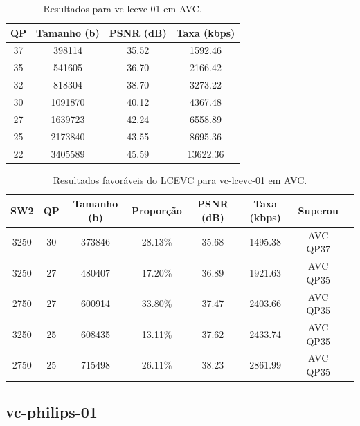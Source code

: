 \begin{table}[h]
    \centering
    \begin{tabular}{|c|c|c|c|}
        \hline
        \textbf{QP} & \textbf{Tamanho (b)} & \textbf{PSNR (dB)} & \textbf{Taxa (kbps)} \\
        \hline
        37 & 398114 & 35.52 & 1592.46 \\
        35 & 541605 & 36.70 & 2166.42 \\
        32 & 818304 & 38.70 & 3273.22 \\
        30 & 1091870 & 40.12 & 4367.48 \\
        27 & 1639723 & 42.24 & 6558.89 \\
        25 & 2173840 & 43.55 & 8695.36 \\
        22 & 3405589 & 45.59 & 13622.36 \\
        \hline
    \end{tabular}
    \caption{Resultados para vc-lcevc-01 em AVC.}
    \label{tab:vc-lcevc-01-avc}
\end{table}

\begin{table}[h]
    \centering
    \label{tab:vc-lcevc-01-avc-lcevc}
    \begin{tabular}{|c|c|c|c|c|c|c|c|}
        \hline
        \textbf{SW2} & \textbf{QP} & \textbf{Tamanho (b)} & \textbf{Proporção} & \textbf{PSNR (dB)} & \textbf{Taxa (kbps)} & \textbf{Superou} \\
        \hline
        3250 & 30 & 373846 & 28.13\% & 35.68 & 1495.38 & AVC QP37 \\
        3250 & 27 & 480407 & 17.20\% & 36.89 & 1921.63 & AVC QP35 \\
        2750 & 27 & 600914 & 33.80\% & 37.47 & 2403.66 & AVC QP35 \\
        3250 & 25 & 608435 & 13.11\% & 37.62 & 2433.74 & AVC QP35 \\
        2750 & 25 & 715498 & 26.11\% & 38.23 & 2861.99 & AVC QP35 \\
        \hline
    \end{tabular}
    \caption{Resultados favoráveis do LCEVC para vc-lcevc-01 em AVC.}
\end{table}

\newpage
\subsection{vc-philips-01}

